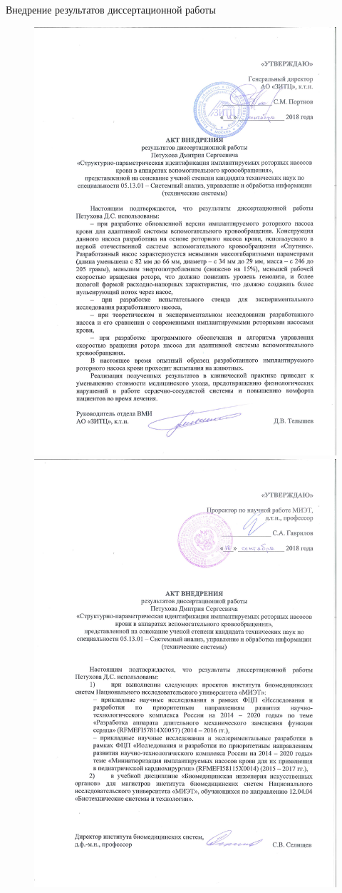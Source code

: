 \documentclass[a4paper, 9pt]{beamer}
\begin{document}
\begin{frame}{Внедрение результатов диссертационной работы}
\begin{minipage}[ht]{0.52\textwidth}
\begin{figure}
\includegraphics[width=0.75\linewidth,angle=-90,origin=c]{../images/act_1} \includegraphics[width=0.75\linewidth,angle=-90,origin=c]{../images/act_2}
\end{figure}


\end{minipage}
\end{frame}
\end{document}
